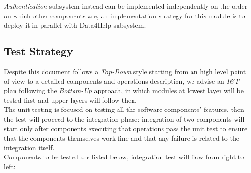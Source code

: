 \documentclass[a4paper]{article}
\begin{document}
\textit{Authentication} subsystem instead can be implemented independently on the order on which other components are; an implementation strategy for this module is to deploy it in parallel with Data4Help subsystem.

\subsection{Test Strategy}
Despite this document follows a \textit{Top-Down} style starting from an high level point of view to a detailed components and operations description, we advise an \textit{I\&T} plan following the \textit{Bottom-Up} approach, in which modules at lowest layer will be tested first and upper layers will follow then.\\

The unit testing is focused on testing all the software components' features, then the test will proceed to the integration phase: integration of two components will start only after components executing that operations pass the unit test to ensure that the components themselves work fine and that any failure is related to the integration itself.\\

Components to be tested are listed below; integration test will flow from right to left:
\end{document}
